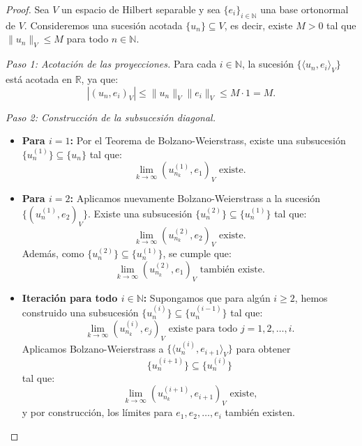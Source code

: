 \documentclass[12pt]{book}
\theoremstyle{definition}
\theoremstyle{plain}
\theoremstyle{remark}
\begin{document}
\begin{proof}
%
%
Sea \( V \) un {espacio de Hilbert separable} y sea \( \{e_i\}_{i \in \mathbb{N}} \) una {base ortonormal} de \( V \). Consideremos una {sucesión acotada} \( \{u_n\} \subseteq V \), es decir, existe \( M > 0 \) tal que \( \|u_n\|_V \leq M \) para todo \( n \in \mathbb{N} \).

\medskip

\noindent \emph{Paso 1: Acotación de las proyecciones.}
Para cada \( i \in \mathbb{N} \), la sucesión \( \{\langle u_n, e_i \rangle_V\} \) está acotada en \( \mathbb{R} \), ya que:
\[
|( u_n, e_i )_V| \leq \|u_n\|_V \|e_i\|_V \leq M \cdot 1 = M.
\]

\medskip

\noindent \emph{Paso 2: Construcción de la subsucesión diagonal.}

\begin{itemize}
    \item \textbf{Para \( i = 1 \):}
    Por el {Teorema de Bolzano-Weierstrass}, existe una subsucesión \( \{u_n^{(1)}\} \subseteq \{u_n\} \) tal que:
    \[
    \lim_{k \to \infty} ( u_{n_k}^{(1)}, e_1 )_V \text{ existe.}
    \]

    \item \textbf{Para \( i = 2 \):}
    Aplicamos nuevamente Bolzano-Weierstrass a la sucesión \( \{( u_n^{(1)}, e_2 )_V\} \). Existe una subsucesión \( \{u_n^{(2)}\} \subseteq \{u_n^{(1)}\} \) tal que:
    \[
    \lim_{k \to \infty} ( u_{n_k}^{(2)}, e_2 )_V \text{ existe.}
    \]
    Además, como \( \{u_n^{(2)}\} \subseteq \{u_n^{(1)}\} \), se cumple que:
    \[
    \lim_{k \to \infty} ( u_{n_k}^{(2)}, e_1 )_V \text{ también existe.}
    \]

    \item \textbf{Iteración para todo \( i \in \mathbb{N} \):}
    Supongamos que para algún \( i \geq 2 \), hemos construido una subsucesión \( \{u_n^{(i)}\} \subseteq \{u_n^{(i-1)}\} \) tal que:
    \[
    \lim_{k \to \infty} ( u_{n_k}^{(i)}, e_j )_V \text{ existe para todo } j = 1, 2, \dots, i.
    \]
    Aplicamos Bolzano-Weierstrass a \( \{\langle u_n^{(i)}, e_{i+1} \rangle_V\} \) para obtener \[ \{u_n^{(i+1)}\} \subseteq \{u_n^{(i)}\} \] tal que:
    \[
    \lim_{k \to \infty} ( u_{n_k}^{(i+1)}, e_{i+1} )_V \text{ existe,}
    \]
    y por construcción, los límites para \( e_1, e_2, \dots, e_i \) también existen.
\end{itemize}


\end{proof}
\end{document}
